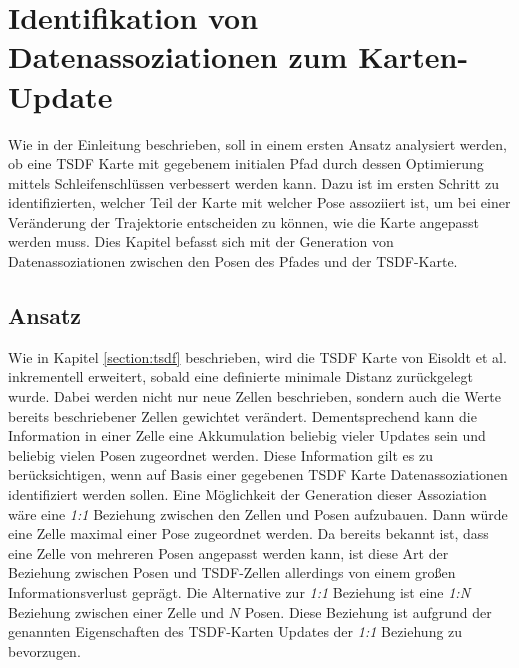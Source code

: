 \chapter{Identifikation von Datenassoziationen zum Karten-Update}\label{chapter:association}

Wie in der Einleitung beschrieben, soll in einem ersten Ansatz analysiert werden, ob eine TSDF Karte mit gegebenem initialen Pfad durch dessen Optimierung mittels Schleifenschlüssen verbessert werden kann. Dazu ist im ersten Schritt zu identifizierten, welcher Teil der Karte mit welcher Pose assoziiert ist, um bei einer Veränderung der Trajektorie entscheiden zu können, wie die Karte angepasst werden muss. Dies Kapitel befasst sich mit der Generation von Datenassoziationen zwischen den Posen des Pfades und der TSDF-Karte.

\section{Ansatz}
\label{section:ansatz}

Wie in Kapitel \ref{section:tsdf} beschrieben, wird die TSDF Karte von Eisoldt et al. \cite{HATSDF} inkrementell erweitert, sobald eine definierte minimale Distanz zurückgelegt wurde. Dabei werden nicht nur neue Zellen beschrieben, sondern auch die Werte bereits beschriebener Zellen gewichtet verändert. Dementsprechend kann die Information in einer Zelle eine Akkumulation beliebig vieler Updates sein und beliebig vielen Posen zugeordnet werden. Diese Information gilt es zu berücksichtigen, wenn auf Basis einer gegebenen TSDF Karte Datenassoziationen identifiziert werden sollen.
Eine Möglichkeit der Generation dieser Assoziation wäre eine \emph{1:1} Beziehung zwischen den Zellen und Posen aufzubauen. Dann würde eine Zelle maximal einer Pose zugeordnet werden. Da bereits bekannt ist, dass eine Zelle von mehreren Posen angepasst werden kann, ist diese Art der Beziehung zwischen Posen und TSDF-Zellen allerdings von einem großen Informationsverlust geprägt. Die Alternative zur \emph{1:1} Beziehung ist eine \emph{1:N} Beziehung zwischen einer Zelle und $N$ Posen. Diese Beziehung ist aufgrund der genannten Eigenschaften des TSDF-Karten Updates der \emph{1:1} Beziehung zu bevorzugen.

